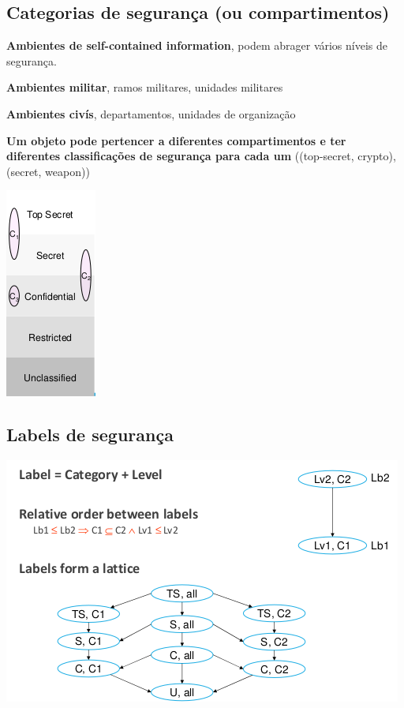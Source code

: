 \documentclass{article}
\begin{document}
\subsection{Categorias de segurança (ou compartimentos)}

\begin{flushleft}
  \textbf{Ambientes de self-contained information}, podem abrager
  vários níveis de segurança.

  \vspace{2mm}

  \textbf{Ambientes militar}, ramos militares, unidades militares

  \vspace{2mm}

  \textbf{Ambientes civís}, departamentos, unidades de organização

  \vspace{2mm}

  \textbf{Um objeto pode pertencer a diferentes compartimentos e
  ter diferentes classificações de segurança para cada um} ((top-secret, crypto),
  (secret, weapon))

  \begin{center}
    \includegraphics[scale=0.4]{23}
  \end{center}
\end{flushleft}

\subsection{Labels de segurança}

\begin{center}
  \includegraphics[scale=0.4]{24}
\end{center}
\end{document}
